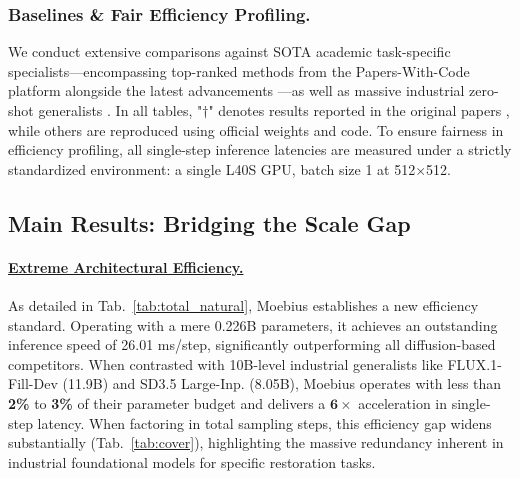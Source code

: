 \documentclass[runningheads]{llncs}
\begin{document}
\subsubsection{Baselines \& Fair Efficiency Profiling.} 
We conduct extensive comparisons against SOTA academic task-specific specialists—encompassing top-ranked methods from the Papers-With-Code platform\cite{paperwithcode} alongside the latest advancements \cite{xu2025pixelhacker, Li2025RoRem, Chen2024LCI, manukyan2023hdpainter}—as well as massive industrial zero-shot generalists \cite{flux2024, esser2024SD3}. In all tables, "$\dag$" denotes results reported in the original papers \cite{xu2025pixelhacker, li2022mat, Sargsyan2023migan, zhuang2023powerpaint}, while others are reproduced using official weights and code. To ensure fairness in efficiency profiling, all single-step inference latencies are measured under a strictly standardized environment: a single L40S GPU, batch size 1 at 512$\times$512.

\vspace{-0.5em}
\subsection{Main Results: Bridging the Scale Gap}\label{subsec:main_results}

\vspace{-0.5em}
\paragraph{\underline{Extreme Architectural Efficiency.}}
As detailed in Tab.~\ref{tab:total_natural}, Moebius establishes a new efficiency standard. Operating with a mere 0.226B parameters, it achieves an outstanding inference speed of 26.01 ms/step, significantly outperforming all diffusion-based competitors. When contrasted with 10B-level industrial generalists like FLUX.1-Fill-Dev (11.9B) and SD3.5 Large-Inp. (8.05B), Moebius operates with less than \textbf{2\%} to \textbf{3\%} of their parameter budget and delivers a $\boldsymbol{6\times}$ acceleration in single-step latency. When factoring in total sampling steps, this efficiency gap widens substantially (Tab.~\ref{tab:cover}), highlighting the massive redundancy inherent in industrial foundational models for specific restoration tasks.



\vspace{-0.5em}
\end{document}
